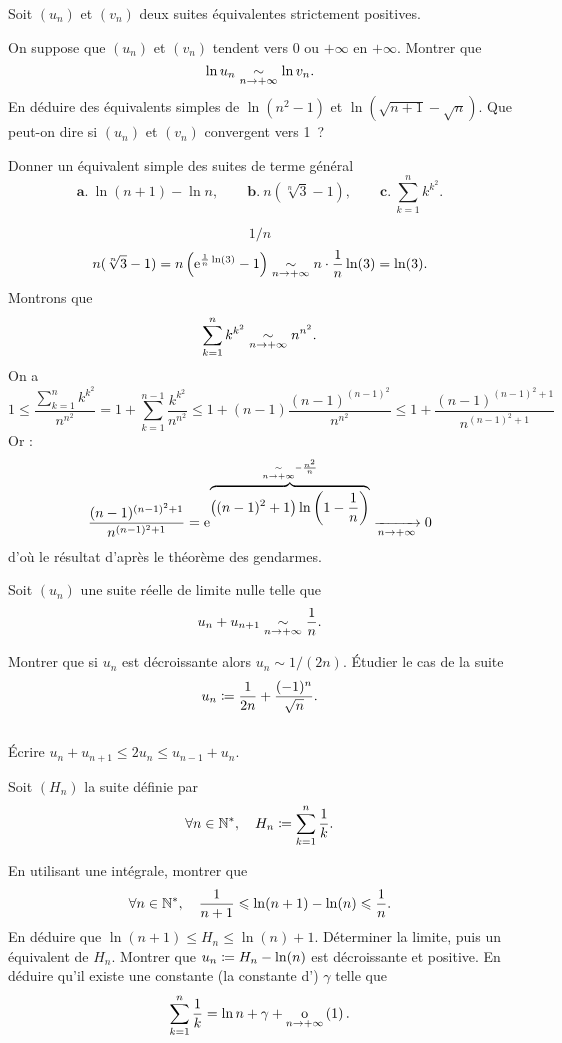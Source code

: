 \documentclass{magnolia}
\begin{document}


Soit $(u_n)$ et $(v_n)$ deux suites équivalentes strictement positives.
\begin{questions}
\question On suppose que $(u_n)$ et $(v_n)$ tendent vers $0$ ou $+\infty$ en
$+\infty$. Montrer que
\[\ln u_n \underset{n\rightarrow +\infty}{\sim} \ln v_n.\]
En déduire des équivalents simples de $\ln(n^2-1)$ et $\ln(\sqrt{n+1}-\sqrt{n})$.
\question Que peut-on dire si $(u_n)$ et $(v_n)$ convergent vers 1~?
\end{questions}

Donner un équivalent simple des suites de terme général
\[\textbf{a.}\ \ln(n+1)-\ln n, \qquad \textbf{b.}\ n(\sqrt[n]{3}-1), \qquad \textbf{c.}\ \sum_{k=1}^n k^{k^2}.\]

\begin{sol}
$$1/n$$
$$n(\sqrt[n]{3}-1)=n\left({\rm e}^{\frac{1}{n}\ln(3)}-1\right)\underset{n\rightarrow +\infty}{\sim}n\cdot \frac{1}{n}\ln(3)=\ln(3).$$
Montrons que $$\sum_{k=1}^n k^{k^2}\underset{n\rightarrow +\infty}{\sim}n^{n^2}.$$
On a $$1\leq \frac{\sum_{k=1}^n k^{k^2}}{n^{n^2}}=1+\sum_{k=1}^{n-1} \frac{k^{k^2}}{n^{n^2}}\leq 1+(n-1)\frac{(n-1)^{(n-1)^2}}{n^{n^2}}\leq 1+\frac{(n-1)^{(n-1)^2+1}}{n^{(n-1)^2+1}}$$
Or : $$\frac{(n-1)^{(n-1)^2+1}}{n^{(n-1)^2+1}}={\rm e}^{\overbrace{\left((n-1)^2+1\right)\ln\left(1-\frac{1}{n}\right)}^{\underset{n\rightarrow +\infty}{\sim}-\frac{n^2}{n}}}\xrightarrow[n\rightarrow +\infty]{}0$$ d'où le résultat d'après le théorème des gendarmes.
\end{sol}


Soit $(u_n)$ une suite réelle de limite nulle telle que
\[u_n+u_{n+1} \underset{n\rightarrow +\infty}{\sim} \frac{1}{n}.\]
\begin{questions}
\question Montrer que si $u_n$ est décroissante alors $u_n \sim 1/(2n)$.
\question Étudier le cas de la suite \[u_n\coloneqq\frac 1{2n}+\frac{(-1)^n}{\sqrt{n}}.\]
\end{questions}
\begin{sol}
$\quad$
\begin{questions}
\question Écrire $u_n+u_{n+1}\leq 2u_n\leq u_{n-1}+u_{n}$.
\end{questions}
\end{sol}



Soit $(H_n)$ la suite définie par
\[\forall n\in{\mathbb{N}^*} ,\quad H_n\coloneqq\sum_{k=1}^n \frac{1}{k}.\]
\begin{questions}
\question En utilisant une intégrale, montrer que
  \[\forall n\in{\mathbb{N}^*},\quad \frac{1}{n + 1} \leqslant \ln(n + 1)-\ln (n) \leqslant\frac{1}{n}.\]
\question En déduire que $\ln (n + 1) \leq H_n \leq \ln (n) + 1$.
\question Déterminer la limite, puis un équivalent de $H_n$.
\question Montrer que $u_n\coloneqq H_n-\ln (n)$ est décroissante et positive. En
  déduire qu'il existe une constante (la constante d') $\gamma$ telle que
 \[\sum_{k = 1}^n \frac 1k = \ln n + \gamma + \underset{n \rightarrow +\infty}{\text{o}}\left(1\right).\]
\end{questions}
\end{document}
